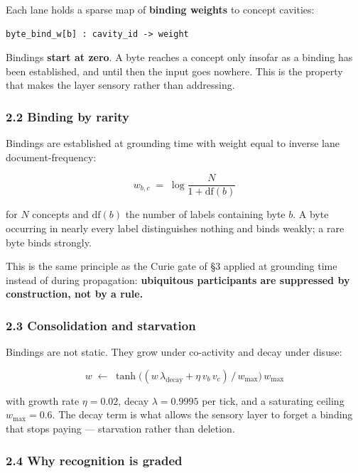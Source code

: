 \documentclass[
  11pt,
  a4paper,
]{article}
\begin{document}
Each lane holds a sparse map of \textbf{binding weights} to concept
cavities:

\begin{verbatim}
byte_bind_w[b] : cavity_id -> weight
\end{verbatim}

Bindings \textbf{start at zero}. A byte reaches a concept only insofar
as a binding has been established, and until then the input goes
nowhere. This is the property that makes the layer sensory rather than
addressing.

\subsubsection{2.2 Binding by rarity}\label{binding-by-rarity}

Bindings are established at grounding time with weight equal to inverse
lane document-frequency:

\[
w_{b,c} \;=\; \log \frac{N}{1 + \mathrm{df}(b)}
\]

for \(N\) concepts and \(\mathrm{df}(b)\) the number of labels
containing byte \(b\). A byte occurring in nearly every label
distinguishes nothing and binds weakly; a rare byte binds strongly.

This is the same principle as the Curie gate of §3 applied at grounding
time instead of during propagation: \textbf{ubiquitous participants are
suppressed by construction, not by a rule.}

\subsubsection{2.3 Consolidation and
starvation}\label{consolidation-and-starvation}

Bindings are not static. They grow under co-activity and decay under
disuse:

\[
w \;\leftarrow\; \tanh\big( (w\,\lambda_{\text{decay}} + \eta\, v_b\, v_c)
\,/\, w_{\max} \big)\, w_{\max}
\]

with growth rate \(\eta = 0.02\), decay \(\lambda = 0.9995\) per tick,
and a saturating ceiling \(w_{\max} = 0.6\). The decay term is what
allows the sensory layer to forget a binding that stops paying ---
starvation rather than deletion.

\subsubsection{2.4 Why recognition is
graded}\label{why-recognition-is-graded}
\end{document}
